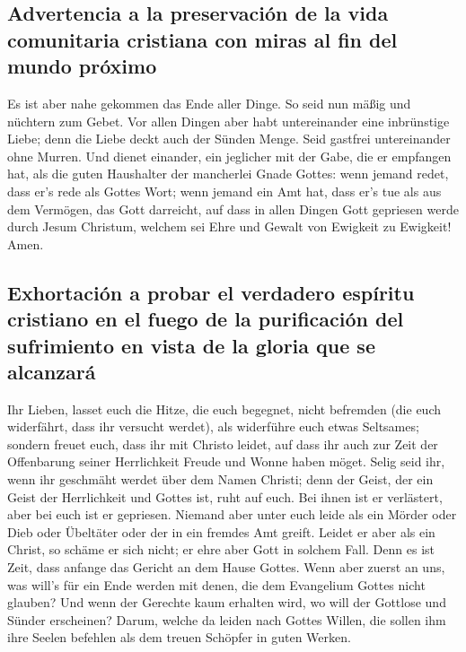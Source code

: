 \hypertarget{advertencia-a-la-preservaciuxf3n-de-la-vida-comunitaria-cristiana-con-miras-al-fin-del-mundo-pruxf3ximo}{%
\subsection{Advertencia a la preservación de la vida comunitaria
cristiana con miras al fin del mundo
próximo}\label{advertencia-a-la-preservaciuxf3n-de-la-vida-comunitaria-cristiana-con-miras-al-fin-del-mundo-pruxf3ximo}}

 Es ist aber nahe gekommen das Ende aller Dinge.
 So seid nun mäßig und nüchtern zum Gebet. Vor allen
Dingen aber habt untereinander eine inbrünstige Liebe; denn die Liebe
deckt auch der Sünden Menge.  Seid gastfrei untereinander
ohne Murren.  Und dienet einander, ein jeglicher mit der
Gabe, die er empfangen hat, als die guten Haushalter der mancherlei
Gnade Gottes:  wenn jemand redet, dass er's rede als
Gottes Wort; wenn jemand ein Amt hat, dass er's tue als aus dem
Vermögen, das Gott darreicht, auf dass in allen Dingen Gott gepriesen
werde durch Jesum Christum, welchem sei Ehre und Gewalt von Ewigkeit zu
Ewigkeit! Amen.

\hypertarget{exhortaciuxf3n-a-probar-el-verdadero-espuxedritu-cristiano-en-el-fuego-de-la-purificaciuxf3n-del-sufrimiento-en-vista-de-la-gloria-que-se-alcanzaruxe1}{%
\subsection{Exhortación a probar el verdadero espíritu cristiano en el
fuego de la purificación del sufrimiento en vista de la gloria que se
alcanzará}\label{exhortaciuxf3n-a-probar-el-verdadero-espuxedritu-cristiano-en-el-fuego-de-la-purificaciuxf3n-del-sufrimiento-en-vista-de-la-gloria-que-se-alcanzaruxe1}}

 Ihr Lieben, lasset euch die Hitze, die euch begegnet,
nicht befremden (die euch widerfährt, dass ihr versucht werdet), als
widerführe euch etwas Seltsames;  sondern freuet euch,
dass ihr mit Christo leidet, auf dass ihr auch zur Zeit der Offenbarung
seiner Herrlichkeit Freude und Wonne haben möget.  Selig
seid ihr, wenn ihr geschmäht werdet über dem Namen Christi; denn der
Geist, der ein Geist der Herrlichkeit und Gottes ist, ruht auf euch. Bei
ihnen ist er verlästert, aber bei euch ist er gepriesen. 
Niemand aber unter euch leide als ein Mörder oder Dieb oder Übeltäter
oder der in ein fremdes Amt greift.  Leidet er aber als
ein Christ, so schäme er sich nicht; er ehre aber Gott in solchem Fall.
 Denn es ist Zeit, dass anfange das Gericht an dem Hause
Gottes. Wenn aber zuerst an uns, was will's für ein Ende werden mit
denen, die dem Evangelium Gottes nicht glauben?  Und wenn
der Gerechte kaum erhalten wird, wo will der Gottlose und Sünder
erscheinen?  Darum, welche da leiden nach Gottes Willen,
die sollen ihm ihre Seelen befehlen als dem treuen Schöpfer in guten
Werken.

